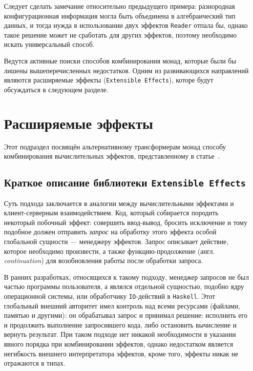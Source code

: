 Следует сделать замечание относительно предыдущего примера: разнородная 
конфигурационная информация могла быть объединена в алгебраический тип данных, 
и тогда нужда в использовании двух эффектов \lstinline{Reader} отпала бы, 
однако такое решение может не сработать для других эффектов, поэтому необходимо 
искать универсальный способ.

Ведутся активные поиски способов комбинирования монад, которые были бы лишены 
вышеперечисленных недостатков. Одним из развивающихся направлений являются 
расширяемые эффекты (\lstinline{Extensible Effects}), которе будут обсуждаться
в следующем разделе.

\section{Расширяемые эффекты}

Этот подраздел посвящён альтернативному трансформерам монад способу 
комбинирования вычислительных эффектов, 
представленному в статье~\cite{extEffects}.

\subsection{Краткое описание библиотеки \lstinline{Extensible Effects}}

Суть подхода заключается в аналогии между вычислительными эффектами и 
клиент-серверным взаимодействием. Код, который собирается породить некоторый 
побочный эффект: совершить ввод-вывод, бросить исключение и тому подобное должен 
отправить \emph{запрос} на обработку этого эффекта особой глобальной сущности 
--- менеджеру эффектов. Запрос описывает действие, которое необходимо 
произвести, а также функцию-продолжение (англ. \emph{continuation}) для 
возобновления работы после обработки запроса.

В ранних разработках, относящихся к такому подходу, менеджер запросов не был 
частью программы пользователя, а являлся отдельной сущностью, подобно ядру 
операционной системы, или обработчику \lstinline{IO}-действий в 
\lstinline{Haskell}. Этот глобальный внешний авторитет имел контроль над всеми
ресурсами (файлами, памятью и другими): он обрабатывал запрос и принимал решение: 
исполнить его и продолжить выполнение запросившего кода, либо остановить 
вычисление и вернуть результат. При таком подходе нет никакой необходимости в
указании явного порядка при комбинировании эффектов, однако недостатком является
негибкость внешнего интерпретатора эффектов, кроме того, эффекты никак 
не отражаются в типах.

